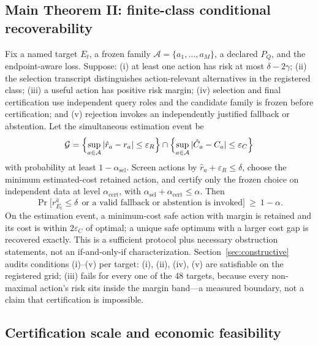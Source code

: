\documentclass{article}
\renewcommand{\Pr}{\mathop{\mathrm{Pr}}}   %
\newcommand{\Acal}{\mathcal{A}}
\begin{document}
\subsection{Main Theorem II: finite-class conditional recoverability}

Fix a named target $E_t$, a frozen family $\Acal=\{a_1,\dots,a_M\}$, a declared $P_Q$, and the
endpoint-aware loss. Suppose: (i) at least one action has risk at most $\delta-2\gamma$; (ii) the selection
transcript distinguishes action-relevant alternatives in the registered class; (iii) a useful action has
positive risk margin; (iv) selection and final certification use independent query roles and the candidate
family is frozen before certification; and (v) rejection invokes an independently justified fallback or
abstention. Let the simultaneous estimation event be
\begin{equation}
\mathcal{G}
=\Bigl\{\sup_{a\in\Acal}|\hat r_{a}-r_{a}|\le\varepsilon_{R}\Bigr\}
\cap\Bigl\{\sup_{a\in\Acal}|\hat C_{a}-C_{a}|\le\varepsilon_{C}\Bigr\}
\label{eq:eventG}
\end{equation}
with probability at least $1-\alpha_{\mathrm{sel}}$. Screen actions by $\hat r_{a}+\varepsilon_{R}\le\delta$,
choose the minimum estimated-cost retained action, and certify only the frozen choice on independent data at
level $\alpha_{\mathrm{cert}}$, with $\alpha_{\mathrm{sel}}+\alpha_{\mathrm{cert}}\le\alpha$. Then
\begin{equation}
\Pr\bigl[r_{E_{t}}^{\hat a}\le\delta\ \ \text{or a valid fallback or abstention is invoked}\bigr]\ \ge\ 1-\alpha.
\label{eq:thm2}
\end{equation}
On the estimation event, a minimum-cost safe action with margin is retained and its cost is within
$2\varepsilon_{C}$ of optimal; a unique safe optimum with a larger cost gap is recovered exactly. This is a
sufficient protocol plus necessary obstruction statements, not an if-and-only-if characterization.
Section~\ref{sec:constructive} audits conditions (i)--(v) per target: (i), (ii), (iv), (v) are satisfiable
on the registered grid; (iii) fails for every one of the 48 targets, because every non-maximal action's risk
sits inside the margin band---a measured boundary, not a claim that certification is impossible.

\subsection{Certification scale and economic feasibility}
\end{document}
